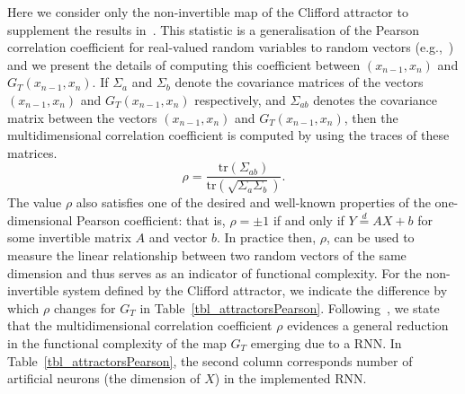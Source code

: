 Here we consider only the non-invertible map of the Clifford attractor to supplement the results in~\cite{Supp}. 
This statistic is a generalisation of the Pearson correlation coefficient for real-valued random variables to random vectors (e.g.,~\cite{puccetti2019measuring}) and we present the details of computing this coefficient between $(x_{n-1},x_n)$ and $G_T(x_{n-1},x_n)$. 
If $\Sigma_{a}$ and $\Sigma_{b}$ denote the covariance matrices of the vectors $(x_{n-1},x_n)$ and $G_T(x_{n-1},x_n)$ respectively, and $\Sigma_{ab}$ denotes the covariance matrix between the vectors $(x_{n-1},x_n)$ and $G_T(x_{n-1},x_n)$, then the multidimensional correlation coefficient is computed by using the traces of these matrices.
\[
    \rho= \frac{\text{tr}({\Sigma_{ab}})}{\text{tr}({\sqrt{\Sigma_a\Sigma_b}})}.
\]
The value $\rho$ also satisfies one of the desired and well-known properties of the one-dimensional Pearson coefficient: that is, $\rho=\pm 1$ if and only if $Y\overset{d}{=}AX+b$ for some invertible matrix $A$ and vector $b$. 
In practice then, $\rho$, can be used to measure the linear relationship between two random vectors of the same dimension and thus serves as an indicator of functional complexity. 
For the non-invertible system defined by the Clifford attractor, we indicate the difference by which $\rho$ changes for $G_T$ in Table~\ref{tbl_attractorsPearson}.
Following~\cite{manjunath2021universal}, we state that the multidimensional correlation coefficient $\rho$ evidences a general reduction in the functional complexity of the map $G_T$ emerging due to a RNN. 
In Table~\ref{tbl_attractorsPearson}, the second column corresponds number of artificial neurons (the dimension of $X$) in the implemented RNN.
               
